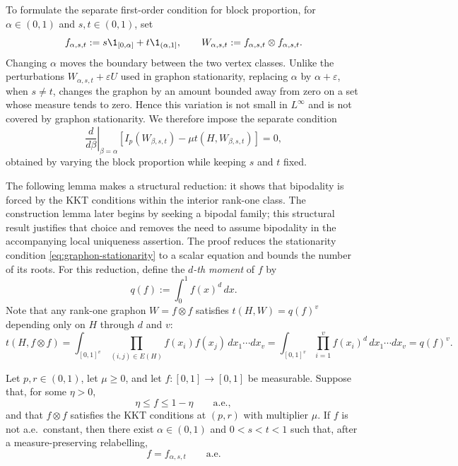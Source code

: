 To formulate the separate first-order condition for block proportion,
for $\alpha\in(0,1)$ and $s,t\in(0,1)$, set
\[
  f_{\alpha,s,t}
  :=s\1_{[0,\alpha]}+t\1_{(\alpha,1]},
  \qquad
  W_{\alpha,s,t}:=f_{\alpha,s,t}\otimes f_{\alpha,s,t}.
\]
Changing $\alpha$ moves the boundary between the two vertex classes.  Unlike
the perturbations $W_{\alpha,s,t}+\varepsilon U$ used in graphon stationarity,
replacing $\alpha$ by $\alpha+\varepsilon$, when $s\ne t$, changes the graphon
by an amount bounded away from zero on a set whose measure tends to zero.
Hence this variation is not small in $L^\infty$ and is not covered by graphon
stationarity.  We therefore impose the separate condition
\begin{equation}\label{eq:block-stationarity}
  \left.\frac{d}{d\beta}\right|_{\beta=\alpha}
  \left[
    I_p(W_{\beta,s,t})-\mu t(H,W_{\beta,s,t})
  \right]=0,
\end{equation}
obtained by varying the block proportion while keeping $s$ and $t$ fixed.

The following lemma makes a structural reduction: it shows that bipodality is
forced by the KKT conditions within the interior rank-one class.  The
construction lemma later begins by seeking a bipodal family; this structural
result justifies that choice and removes the need to assume bipodality in
the accompanying local uniqueness assertion.  The proof reduces the stationarity condition
\eqref{eq:graphon-stationarity} to a scalar equation and bounds the
number of its roots.  For this reduction, define the \emph{$d$-th moment} of
$f$ by
\[
  q(f):=\int_0^1 f(x)^d\,dx.
\]
Note that any rank-one graphon $W=f\otimes f$ satisfies
$t(H,W)=q(f)^v$ depending only on $H$ through $d$ and $v$:
\[
  t(H,f\otimes f)
  =\int_{[0,1]^v}\prod_{(i,j)\in E(H)}f(x_i)f(x_j)\,dx_1\cdots dx_v
  =\int_{[0,1]^v}\prod_{i=1}^v f(x_i)^{d}\,dx_1\cdots dx_v
  =q(f)^v.
\]

\begin{lemma}
\label{lem:stationary-rank-one-bipodality}
Let $p,r\in(0,1)$, let $\mu\ge0$, and let
$f:[0,1]\to[0,1]$ be measurable.  Suppose that, for some $\eta>0$,
\[
  \eta\le f\le1-\eta
  \qquad\text{a.e.},
\]
and that $f\otimes f$ satisfies the KKT conditions at $(p,r)$ with multiplier
$\mu$.  If $f$ is not a.e.\ constant, then there exist $\alpha\in(0,1)$ and
$0<s<t<1$ such that, after a measure-preserving relabelling,
\[
  f=f_{\alpha,s,t}
  \qquad\text{a.e.}
\]
\end{lemma}

